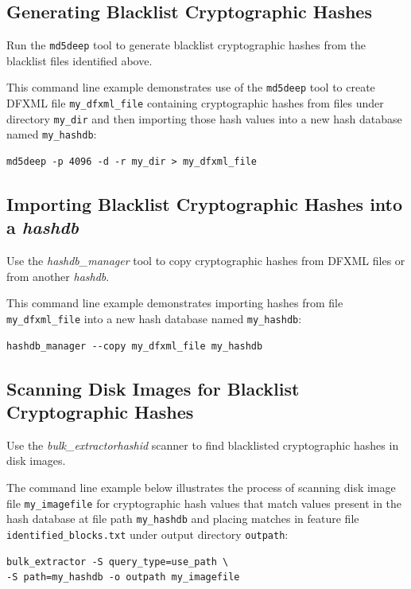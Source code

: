 \documentclass[11pt,twoside]{article}
\newcommand \bulk {\textit{bulk\_extractor}\xspace}
\newcommand \hdb {\textit{hashdb}\xspace}
\newcommand \hdbm {\textit{hashdb\_manager}\xspace}
\newcommand \hid {\textit{hashid}\xspace}
\begin{document}
\subsection{Generating Blacklist Cryptographic Hashes}
Run the \texttt{md5deep} tool to generate blacklist cryptographic hashes
from the blacklist files identified above.

This command line example demonstrates use of the \texttt{md5deep} tool
to create DFXML file \texttt{my\_dfxml\_file}
containing cryptographic hashes from files under directory \texttt{my\_dir}
and then importing those hash values into a new hash database
named \texttt{my\_hashdb}:

\begin{small}
\begin{verbatim}
md5deep -p 4096 -d -r my_dir > my_dfxml_file
\end{verbatim}
\end{small}

\subsection{Importing Blacklist Cryptographic Hashes into a \hdb}
Use the \hdbm tool to copy cryptographic hashes from DFXML files
or from another \hdb.

This command line example demonstrates importing
hashes from file \texttt{my\_dfxml\_file}
into a new hash database named \texttt{my\_hashdb}:

\begin{small}
\begin{verbatim}
hashdb_manager --copy my_dfxml_file my_hashdb
\end{verbatim}
\end{small}

\subsection{Scanning Disk Images for Blacklist Cryptographic Hashes}
Use the \bulk \hid scanner to find blacklisted cryptographic hashes in disk images.

The command line example below illustrates the process of scanning
disk image file \texttt{my\_imagefile}
for cryptographic hash values that match values present
in the hash database at file path \texttt{my\_hashdb} and placing
matches in feature file \texttt{identified\_blocks.txt}
under output directory \texttt{outpath}:

\begin{small}
\begin{verbatim}
bulk_extractor -S query_type=use_path \
-S path=my_hashdb -o outpath my_imagefile
\end{verbatim}
\end{small}
\end{document}
